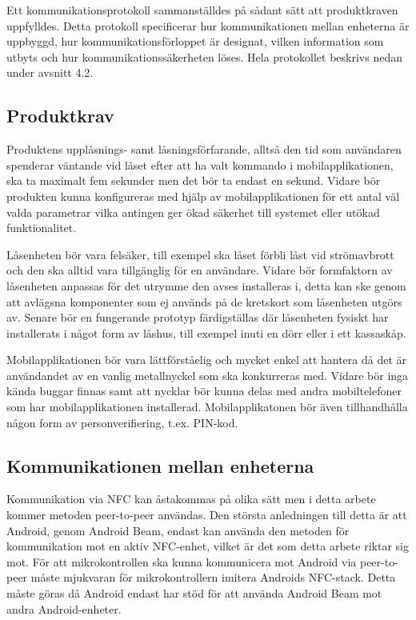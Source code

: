 \documentclass[11pt]{article}
\begin{document}
Ett kommunikationsprotokoll sammanställdes på sådant sätt att produktkraven uppfylldes. Detta protokoll specificerar hur kommunikationen mellan enheterna är uppbyggd, hur kommunikationsförloppet är designat, vilken information som utbyts och hur kommunikationssäkerheten löses. Hela protokollet beskrivs nedan under avsnitt 4.2.

\subsection{Produktkrav}
Produktens upplåsnings- samt låsningsförfarande, alltså den tid som användaren spenderar väntande vid låset efter att ha valt kommando i mobilapplikationen, ska ta maximalt fem sekunder men det bör ta endast en sekund. Vidare bör produkten kunna konfigureras med hjälp av mobilapplikationen för ett antal väl valda parametrar vilka antingen ger ökad säkerhet till systemet eller utökad funktionalitet.

Låsenheten bör vara felsäker, till exempel ska låset förbli låst vid strömavbrott och den ska alltid vara tillgänglig för en användare. Vidare bör formfaktorn av låsenheten anpassas för det utrymme den avses installeras i, detta kan ske genom att avlägsna komponenter som ej används på de kretskort som låsenheten utgörs av. Senare bör en fungerande prototyp färdigställas där låsenheten fysiskt har installerats i något form av låshus, till exempel inuti en dörr eller i ett kassaskåp.

Mobilapplikationen bör vara lättförståelig och mycket enkel att hantera då det är användandet av en vanlig metallnyckel som ska konkurreras med. Vidare bör inga kända buggar finnas samt att nycklar bör kunna delas med andra mobiltelefoner som har mobilapplikationen installerad. Mobilapplikatonen bör även tillhandhålla någon form av personverifiering, t.ex. PIN-kod.

\subsection{Kommunikationen mellan enheterna}
Kommunikation via NFC kan åstakommas på olika sätt men i detta arbete kommer metoden peer-to-peer användas. Den största anledningen till detta är att Android, genom Android Beam, endast kan använda den metoden för kommunikation mot en aktiv NFC-enhet, vilket är det som detta arbete riktar sig mot. För att mikrokontrollen ska kunna kommunicera mot Android via peer-to-peer måste mjukvaran för mikrokontrollern imitera Androids NFC-stack. Detta måste göras då Android endast har stöd för att använda Android Beam mot andra Android-enheter.
\end{document}
